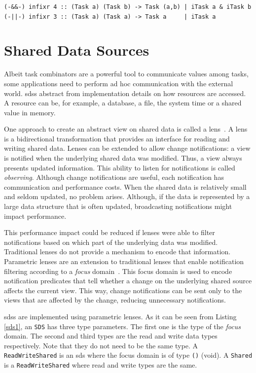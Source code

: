 \begin{lstlisting}[caption=Parallel combinators,label=par_comb,captionpos=b]
(-&&-) infixr 4 :: (Task a) (Task b) -> Task (a,b) | iTask a & iTask b
(-||-) infixr 3 :: (Task a) (Task a) -> Task a     | iTask a
\end{lstlisting}


\section{Shared Data Sources}

Albeit task combinators are a powerful tool to 
communicate values among tasks, some applications need to perform ad hoc communication with the external world. \acp{sds} abstract from implementation details on how resources are accessed. A resource can be, for example, a database, a file, the system time or a shared value in memory. 

One approach to create an abstract view on shared data is called a lens~\cite{lenses}. A lens is a bidirectional transformation that provides an interface for reading and writing shared data. Lenses can be extended to allow change notifications: a view is notified when the underlying shared data was modified. Thus, a view always presents updated information. This ability to listen for notifications is called \textit{observing}. Although change notifications are useful, each notification has communication and performance costs. When the shared data is relatively small and seldom updated, no problem arises. Although, if the data is represented by a large data structure that is often updated, broadcasting notifications might impact performance. 

This performance impact could be reduced if lenses were able to filter notifications based on which part of the underlying data was modified. Traditional lenses do not provide a mechanism to encode that information. Parametric lenses are an extension to traditional lenses that enable notification filtering according to a \textit{focus} domain~\cite{parametric}. This focus domain is used to encode notification predicates that tell whether a change on the underlying shared source affects the current view. This way, change notifications can be sent only to the views that are affected by the change, reducing unnecessary notifications.

\acp{sds} are implemented using parametric lenses. As it can be seen from Listing \ref{sds1}, an \texttt{SDS} has three type parameters. The first one is the type of the \textit{focus} domain. The second and third types are the read and write data types respectively. Note that they do not need to be the same type. A \texttt{ReadWriteShared} is an \ac{sds} where the focus domain is of type \texttt{()} (void). A \texttt{Shared} is a \texttt{ReadWriteShared} where read and write types are the same.

